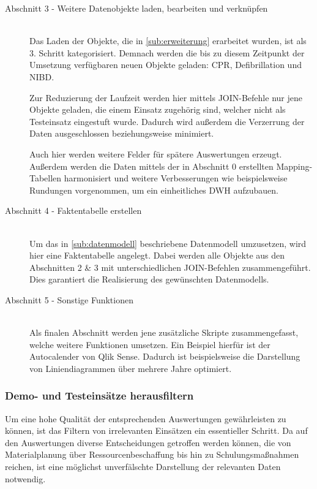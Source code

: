 \begin{description}
\item[Abschnitt 3 - Weitere Datenobjekte laden, bearbeiten und verknüpfen] \hfill \\
Das Laden der Objekte, die in \ref{sub:erweiterung} erarbeitet wurden, ist als 3. Schritt kategorisiert.
Demnach werden die bis zu diesem Zeitpunkt der Umsetzung verfügbaren neuen Objekte geladen: \gls{CPR}, Defibrillation und \gls{NIBD}.

Zur Reduzierung der Laufzeit werden hier mittels JOIN-Befehle nur jene Objekte geladen, die einem Einsatz zugehörig sind, welcher nicht als \glqq Testeinsatz\grqq{} eingestuft wurde.
Dadurch wird außerdem die Verzerrung der Daten ausgeschlossen beziehungsweise minimiert.

Auch hier werden weitere Felder für spätere Auswertungen erzeugt.
Außerdem werden die Daten mittels der in Abschnitt 0 erstellten Mapping-Tabellen harmonisiert und weitere Verbesserungen wie beispielsweise Rundungen vorgenommen, um ein einheitliches \gls{DWH} aufzubauen.

\item[Abschnitt 4 - Faktentabelle erstellen] \hfill \\
Um das in \ref{sub:datenmodell} beschriebene Datenmodell umzusetzen, wird hier eine Faktentabelle angelegt.
Dabei werden alle Objekte aus den Abschnitten 2 \& 3 mit unterschiedlichen JOIN-Befehlen zusammengeführt.
Dies garantiert die Realisierung des gewünschten Datenmodells.

\item[Abschnitt 5 - Sonstige Funktionen] \hfill \\
Als finalen Abschnitt werden jene zusätzliche Skripte zusammengefasst, welche weitere Funktionen umsetzen.
Ein Beispiel hierfür ist der \glqq Autocalender\grqq{} von Qlik Sense.
Dadurch ist beispielsweise die Darstellung von Liniendiagrammen über mehrere Jahre optimiert.
\end{description}

\subsubsection{Demo- und Testeinsätze herausfiltern}
\label{subsub:testfilter}
Um eine hohe Qualität der entsprechenden Auswertungen gewährleisten zu können, ist das Filtern von irrelevanten Einsätzen ein essentieller Schritt.
Da auf den Auswertungen diverse Entscheidungen getroffen werden können, die von Materialplanung über Ressourcenbeschaffung bis hin zu Schulungsmaßnahmen reichen, ist eine möglichst unverfälschte Darstellung der relevanten Daten notwendig.

